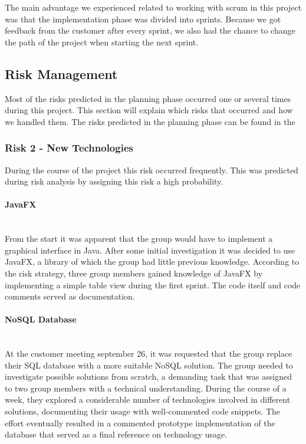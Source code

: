 \documentclass[../document]{subfiles}
\begin{document}
The main advantage we experienced related to working with scrum in this project was that the implementation phase was divided into sprints. Because we got feedback from the customer after every sprint, we also had the chance to change the path of the project when starting the next sprint.  

\subsection{Risk Management}
\label{risk_management}
Most of the risks predicted in the planning phase occurred one or several times during this project. This section will explain which risks that occurred and how we handled them.  The risks predicted in the planning phase can be found in the 

\subsubsection{Risk 2 - New Technologies}
During the course of the project this risk occurred frequently. This was predicted during risk analysis by assigning this risk a high probability. 

\paragraph{JavaFX} \ \\
From the start it was apparent that the group would have to implement a graphical interface in Java. After some initial investigation it was decided to use JavaFX, a library of which the group had little previous knowledge. According to the risk strategy, three group members gained knowledge of JavaFX by implementing a simple table view during the first sprint. The code itself and code comments served as documentation. 

\paragraph{NoSQL Database} \ \\
At the customer meeting september 26, it was requested that the group replace their \gls{SQL} database with a more suitable NoSQL solution. The group needed to investigate possible solutions from scratch, a demanding task that was assigned to two group members with a technical understanding. During the course of a week, they explored a considerable number of technologies involved in different solutions, documenting their usage with well-commented code snippets. The effort eventually resulted in a commented prototype implementation of the database that served as a final reference on technology usage.
\end{document}
